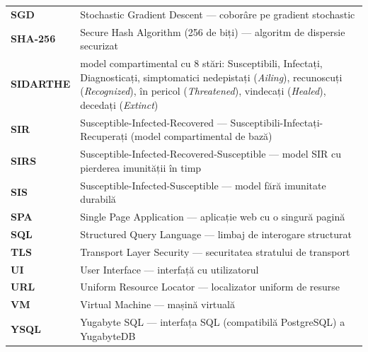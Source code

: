 \begin{longtable}{@{}>{\bfseries}l@{\hspace{1cm}}p{11.3cm}@{}}
SGD        & Stochastic Gradient Descent --- coborâre pe gradient stochastic \\
SHA-256    & Secure Hash Algorithm (256 de biți) --- algoritm de dispersie securizat \\
SIDARTHE   & model compartimental cu 8 stări: Susceptibili, Infectați, Diagnosticați, simptomatici nedepistați (\emph{Ailing}), recunoscuți (\emph{Recognized}), în pericol (\emph{Threatened}), vindecați (\emph{Healed}), decedați (\emph{Extinct}) \\
SIR        & Susceptible-Infected-Recovered --- Susceptibili-Infectați-Recuperați (model compartimental de bază) \\
SIRS       & Susceptible-Infected-Recovered-Susceptible --- model SIR cu pierderea imunității în timp \\
SIS        & Susceptible-Infected-Susceptible --- model fără imunitate durabilă \\
SPA        & Single Page Application --- aplicație web cu o singură pagină \\
SQL        & Structured Query Language --- limbaj de interogare structurat \\
TLS        & Transport Layer Security --- securitatea stratului de transport \\
UI         & User Interface --- interfață cu utilizatorul \\
URL        & Uniform Resource Locator --- localizator uniform de resurse \\
VM         & Virtual Machine --- mașină virtuală \\
YSQL       & Yugabyte SQL --- interfața SQL (compatibilă PostgreSQL) a YugabyteDB \\
\end{longtable}
